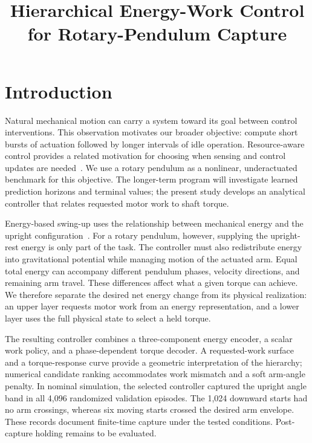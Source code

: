\documentclass[letterpaper,10pt,conference]{ieeeconf}
\title{\bfseries Hierarchical Energy-Work Control for Rotary-Pendulum Capture}
\author{}
\begin{document}
\maketitle
\thispagestyle{empty}
\pagestyle{empty}

\section{Introduction}
Natural mechanical motion can carry a system toward its goal between control interventions. This observation motivates our broader objective: compute short bursts of actuation followed by longer intervals of idle operation. Resource-aware control provides a related motivation for choosing when sensing and control updates are needed~\cite{heemels2012}. We use a rotary pendulum as a nonlinear, underactuated benchmark for this objective. The longer-term program will investigate learned prediction horizons and terminal values; the present study develops an analytical controller that relates requested motor work to shaft torque.

Energy-based swing-up uses the relationship between mechanical energy and the upright configuration~\cite{astrom2000}. For a rotary pendulum, however, supplying the upright-rest energy is only part of the task. The controller must also redistribute energy into gravitational potential while managing motion of the actuated arm. Equal total energy can accompany different pendulum phases, velocity directions, and remaining arm travel. These differences affect what a given torque can achieve. We therefore separate the desired net energy change from its physical realization: an upper layer requests motor work from an energy representation, and a lower layer uses the full physical state to select a held torque.

The resulting controller combines a three-component energy encoder, a scalar work policy, and a phase-dependent torque decoder. A requested-work surface and a torque-response curve provide a geometric interpretation of the hierarchy; numerical candidate ranking accommodates work mismatch and a soft arm-angle penalty. In nominal simulation, the selected controller captured the upright angle band in all 4,096 randomized validation episodes. The 1,024 downward starts had no arm crossings, whereas six moving starts crossed the desired arm envelope. These records document finite-time capture under the tested conditions. Post-capture holding remains to be evaluated.
\end{document}

